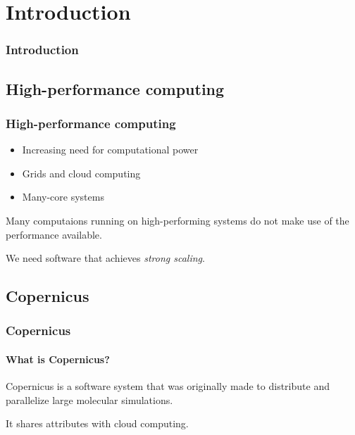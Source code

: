 \section{Introduction}
\begin{frame}
\frametitle{Introduction}
\end{frame}

\subsection*{High-performance computing}
\begin{frame}
\frametitle{High-performance computing}

\begin{itemize}
\pause
\item Increasing need for computational power
\pause
\item Grids and cloud computing
\pause
\item Many-core systems
\end{itemize}
\vspace{10pt}

\pause
Many computaions running on high-performing systems do not make use of
the performance available.
\vspace{10pt}

\pause
We need software that achieves \emph{strong scaling}.

\end{frame}


\subsection*{Copernicus}
\begin{frame}
\frametitle{Copernicus}
\framesubtitle{What is Copernicus?}

Copernicus is a software system that was originally made to distribute
and parallelize large molecular simulations.
\vspace{10pt}

\pause
It shares attributes with cloud computing.
\end{frame}


